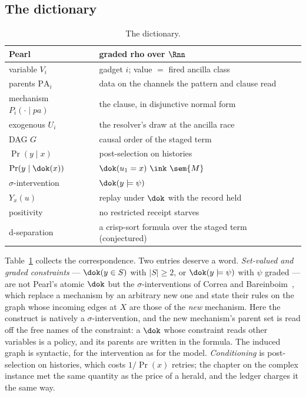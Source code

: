 \subsection{The dictionary}

\begin{table}[t]
\centering\small
\begin{tabular}{@{}>{\raggedright\arraybackslash}p{}>{\raggedright\arraybackslash}p{}@{}}
\toprule
\textbf{Pearl} & \textbf{graded rho over $\Rnn$}\\
\midrule
variable $V_i$ & gadget $i$; value $=$ fired ancilla class\\
parents $\mathrm{PA}_i$ & data on the channels the pattern and clause read\\
mechanism $P_i(\cdot\mid\mathit{pa})$ & the clause, in disjunctive normal form\\
exogenous $U_i$ & the resolver's draw at the ancilla race\\
DAG $G$ & causal order of the staged term\\
$\Pr(y \mid x)$ & post-selection on histories\\
$\Pr(y \mid \dok(x))$ & $\dok(u_1 = x)\ \ink\ \sem{M}$\\
$\sigma$-intervention & $\dok(y \models \psi)$\\
$Y_x(u)$ & replay under $\dok$ with the record held\\
positivity & no restricted receipt starves\\
d-separation & a crisp-sort formula over the staged term (conjectured)\\
\bottomrule
\end{tabular}
\caption{The dictionary.}
\label{do:tab:dictionary}
\end{table}

Table~\ref{do:tab:dictionary} collects the correspondence. Two entries deserve a word.
\emph{Set-valued and graded constraints} --- $\dok(y \in S)$ with $|S| \geq 2$, or
$\dok(y \models \psi)$ with $\psi$ graded --- are not Pearl's atomic $\dok$ but the
$\sigma$-interventions of Correa and Bareinboim~\cite{CorreaBareinboim}, which replace a
mechanism by an arbitrary new one and state their rules on the graph whose incoming edges at $X$
are those of the \emph{new} mechanism. Here the construct is natively a $\sigma$-intervention,
and the new mechanism's parent set is read off the free names of the constraint: a $\dok$ whose
constraint reads other variables is a policy, and its parents are written in the formula. The
induced graph is syntactic, for the intervention as for the model. \emph{Conditioning} is
post-selection on histories, which costs $1/\Pr(x)$ retries; the chapter on the complex instance
met the same quantity as the price of a herald, and the ledger charges it the same way.

